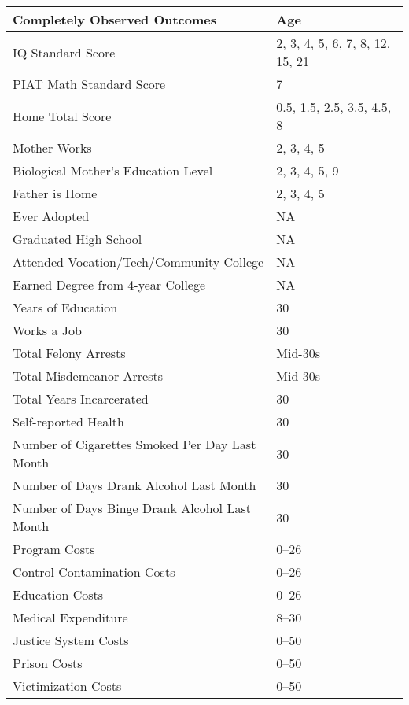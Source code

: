 \begin{tabular}{l l}
\toprule
Completely Observed Outcomes	&	Age	\\
\midrule			
IQ Standard Score	&	2, 3, 4, 5, 6, 7, 8, 12, 15, 21	\\
PIAT Math Standard Score	&	7	\\
Home Total Score	&	0.5, 1.5, 2.5, 3.5, 4.5, 8	\\
Mother Works	&	2, 3, 4, 5	\\
Biological Mother's Education Level	&	2, 3, 4, 5, 9	\\
Father is Home	&	2, 3, 4, 5	\\
Ever Adopted	&		NA \\
Graduated High School	&	NA	\\
Attended Vocation/Tech/Community College	&	NA	\\
Earned Degree from 4-year College	&	NA	\\
Years of Education	&	30	\\
Works a Job	&	30	\\
Total Felony Arrests	&	Mid-30s	\\
Total Misdemeanor Arrests	&	Mid-30s	\\
Total Years Incarcerated	&	30	\\
Self-reported Health	&	30	\\
Number of Cigarettes Smoked Per Day Last Month	&	30	\\
Number of Days Drank Alcohol Last Month	&	30	\\
Number of Days Binge Drank Alcohol Last Month	&	30	\\
Program Costs	&	0--26	\\
Control Contamination Costs	&	0--26	\\
Education Costs	&	0--26	\\
Medical Expenditure &	8--30	\\
Justice System Costs	&	0--50	\\
Prison Costs	&	0--50	\\
Victimization Costs	&	0--50	\\
\bottomrule			
\end{tabular}